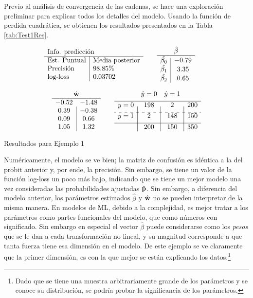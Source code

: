 \documentclass[../Main/Main.tex]{subfiles}
\begin{document}
Previo al análisis de convergencia de las cadenas, se hace una exploración preliminar para explicar todos los detalles del modelo. Usando la función de perdida cuadrática, se obtienen los resultados presentados en la Tabla \ref{tab:Test1Res}.

\begin{table}[h]
\begin{align*}
\resultados{\text{Media posterior}}{98.85}{0.03702}
\quad\quad
\begin{array}{c|c}
\multicolumn{2}{c}{\hat{\beta}} \\
\hline
\hat{\beta_0} & -0.79 \\
\hat{\beta_1} & 3.35 \\
\hat{\beta_2} & 0.65 \\
\end{array}
\quad\quad
\end{align*} 

\begin{align*}
\begin{array}{c|c}
\multicolumn{2}{c}{\hat{\wsn}} \\
\hline
-0.52 	& -1.48 \\
0.39	& -0.38 \\
0.09	& 0.66 \\
1.05	& 1.32
\end{array}
\quad\quad
\matconf{198}{2}{200}{2}{148}{150}{200}{150}{350}
\end{align*}
\caption{Resultados para Ejemplo 1}
\label{tab:Test1Res}
\end{table}

Numéricamente, el modelo se ve bien; la matriz de confusión es idéntica a la del probit anterior y, por ende, la precisión. Sin embargo, se tiene un valor de la función log-loss un poco más bajo, indicando que se tiene un mejor modelo una vez consideradas las probabilidades ajustadas $\hat{\mathbf{p}}$. Sin embargo, a diferencia del modelo anterior, los parámetros estimados $\hat{\beta}$ y $\hat{\mathbf{w}}$ no se pueden interpretar de la misma manera. En modelos de ML, debido a la complejidad, es mejor tratar a los parámetros como partes funcionales del modelo, que como números con significado. Sin embargo en especial el vector $\hat{\beta}$ puede considerarse como los \textit{pesos} que se le dan a cada transformación no lineal, y su magnitud corresponde a que tanta fuerza tiene esa dimensión en el modelo. De este ejemplo se ve claramente que la primer dimensión, es con la que mejor se están explicando los datos.\footnote{Dado que se tiene una muestra arbitrariamente grande de los parámetros y se conoce su distribución, se podría probar la significancia de los parámetros.}
\end{document}

